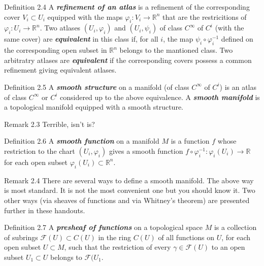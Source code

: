\begin{thing3}{Definition 2.4}\leavevmode
A \textit{\textbf{refinement of an atlas}} is a refinement of the corresponding cover $V_i \subset U_i$ equipped with the maps $\varphi_i:V_i\to \mathbb{R}^n$ that are the restricitions of $\varphi_i:U_i \to \mathbb{R}^n$. Two atlases $(U_i,\varphi_i)$ and $(U_i, \psi_i)$ of class $C^\infty$ of $C^i$ (with the same cover) are \textit{\textbf{equivalent}} in this class if, for all $i$, the map $\psi_i \circ \varphi_i^{-1}$ defined on the corresponding open subset in $\mathbb{R}^n$ belongs to the mantioned class. Two arbitratry atlases are \textit{\textbf{equivalent}} if the corresponding covers possess a common refinement giving equivalent atlases.
\end{thing3}

\begin{thing3}{Definition 2.5}\leavevmode
	A \textit{\textbf{smooth structure}} on a manifold (of class $C^\infty$ of $C^i$) is an atlas of class $C^\infty$ or $C^i$ considered up to the above equivalence. A \textit{\textbf{smooth manifold}} is a topological manifold equipped with a smooth structure.
\end{thing3}

\begin{thing5}{Remark 2.3}\leavevmode
	Terrible, isn't is?
\end{thing5}

\begin{thing3}{Definition 2.6}\leavevmode
	A \textit{\textbf{smooth function}} on a manifold $M$ is a function $f$ whose restriction to the chart $(U_i,\varphi_i)$ gives a smooth function $f \circ \varphi_i^{-1}:\varphi_i(U_i)\to\mathbb{R}$ for each open subset $\varphi_i(U_i) \subset \mathbb{R}^n$.
\end{thing3}

\begin{thing5}{Remark 2.4}\leavevmode
	There are several ways to define a smooth manifold. The above way is most standard. It is not the most convenient one but you should know it. Two other ways (via sheaves of functions and via Whitney's theorem) are presented further in these handouts.
\end{thing5}

\begin{thing3}{Definition 2.7}\leavevmode
	A \textit{\textbf{presheaf of functions}} on a topological space $M$ is a collection of subrings $\mathcal{F}(U) \subset C(U)$ in the ring $C(U)$ of all functions on $U$, for each open subset $U \subset M$, such that the restriction of every $\gamma \in \mathcal{F}(U)$ to an open subset $U_1 \subset U$ belongs to $\mathcal{F}(U_1$.
\end{thing3}

